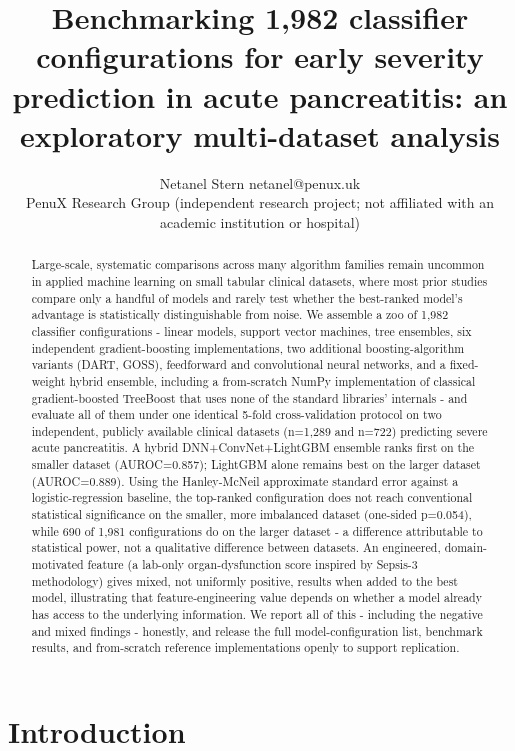 \documentclass[10pt]{article} %
\title{Benchmarking 1,982 classifier configurations for early severity prediction in acute pancreatitis: an exploratory multi-dataset analysis}
\author{\name Netanel Stern \email netanel@penux.uk \\
      \addr PenuX Research Group (independent research project; not affiliated with an academic institution or hospital)}
\begin{document}
\maketitle

\begin{abstract}
Large-scale, systematic comparisons across many algorithm families remain uncommon in applied machine learning on small tabular clinical datasets, where most prior studies compare only a handful of models and rarely test whether the best-ranked model's advantage is statistically distinguishable from noise. We assemble a zoo of 1,982 classifier configurations - linear models, support vector machines, tree ensembles, six independent gradient-boosting implementations, two additional boosting-algorithm variants (DART, GOSS), feedforward and convolutional neural networks, and a fixed-weight hybrid ensemble, including a from-scratch NumPy implementation of classical gradient-boosted TreeBoost that uses none of the standard libraries' internals - and evaluate all of them under one identical 5-fold cross-validation protocol on two independent, publicly available clinical datasets (n=1,289 and n=722) predicting severe acute pancreatitis. A hybrid DNN+ConvNet+LightGBM ensemble ranks first on the smaller dataset (AUROC=0.857); LightGBM alone remains best on the larger dataset (AUROC=0.889). Using the Hanley-McNeil approximate standard error against a logistic-regression baseline, the top-ranked configuration does not reach conventional statistical significance on the smaller, more imbalanced dataset (one-sided p=0.054), while 690 of 1,981 configurations do on the larger dataset - a difference attributable to statistical power, not a qualitative difference between datasets. An engineered, domain-motivated feature (a lab-only organ-dysfunction score inspired by Sepsis-3 methodology) gives mixed, not uniformly positive, results when added to the best model, illustrating that feature-engineering value depends on whether a model already has access to the underlying information. We report all of this - including the negative and mixed findings - honestly, and release the full model-configuration list, benchmark results, and from-scratch reference implementations openly to support replication.
\end{abstract}

\section{Introduction}
\end{document}

